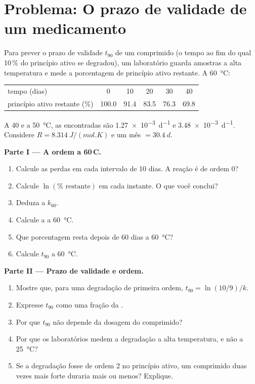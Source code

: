 \section{Problema: O prazo de validade de um medicamento}

\begin{problem}
\label{pb:b1:rate-laws:1}
Para prever o prazo de validade $t_{90}$ de um comprimido (o tempo ao
fim do qual 10\,\% do princípio ativo se degradou), um laboratório
guarda amostras a alta temperatura e mede a porcentagem de princípio
ativo restante. A
\qty{60}{\celsius}:
\begin{center}
\begin{tabular}{lccccc}
\hline
tempo (dias) & 0 & 10 & 20 & 30 & 40 \\
princípio ativo restante (\%) & 100.0 & 91.4 & 83.5 & 76.3 & 69.8 \\
\hline
\end{tabular}
\end{center}
A 40 e a \qty{50}{\celsius}, as  encontradas são
\qty{1.27e-3}{d^{-1}} e \qty{3.48e-3}{d^{-1}}. Considere $R =
\qty{8.314}{J/(mol.K)}$ e um mês $= \qty{30.4}{d}$.

\medskip
\noindent\textbf{Parte I --- A ordem a 60\,\textdegree C.}
\begin{enumerate}
  \item Calcule as perdas em cada intervalo de 10 dias. A reação é de
        ordem 0?
  \item Calcule $\ln(\%\text{ restante})$ em cada instante. O que você conclui?
  \item Deduza a  $k_{60}$.
  \item Calcule a  a \qty{60}{\celsius}.
  \item Que porcentagem resta depois de 60 dias a \qty{60}{\celsius}?
  \item Calcule $t_{90}$ a \qty{60}{\celsius}.
\end{enumerate}

\medskip
\noindent\textbf{Parte II --- Prazo de validade e ordem.}
\begin{enumerate}[resume]
  \item Mostre que, para uma degradação de primeira ordem, $t_{90} = \ln(10/9)/k$.
  \item Expresse $t_{90}$ como uma fração da .
  \item Por que $t_{90}$ não depende da dosagem do comprimido?
  \item Por que os laboratórios medem a degradação a alta temperatura,
        e não a \qty{25}{\celsius}?
  \item Se a degradação fosse de ordem 2 no princípio ativo, um
        comprimido duas vezes mais forte duraria mais ou menos? Explique.
\end{enumerate}


\end{problem}
